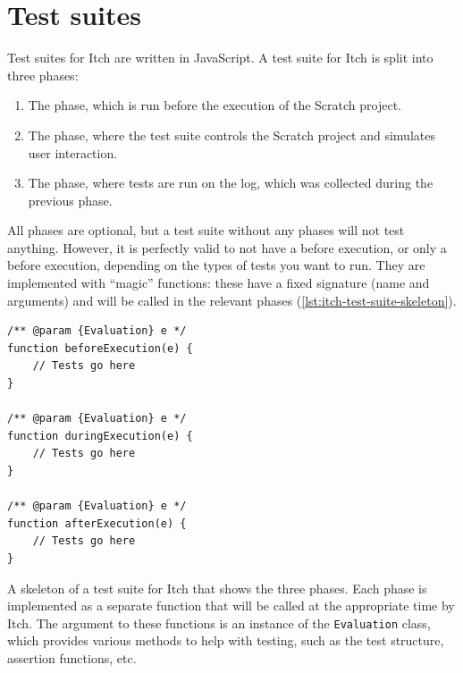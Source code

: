 \documentclass[../main]{subfiles}
\begin{document}
%

\section{Test suites}\label{sec:itch-test-suites}

Test suites for Itch are written in JavaScript.
A test suite for Itch is split into three phases:

\begin{enumerate}
    \item The  phase, which is run before the execution of the Scratch project.
    \item The  phase, where the test suite controls the Scratch project and simulates user interaction.
    \item The  phase, where tests are run on the log, which was collected during the previous phase.
\end{enumerate}

All phases are optional, but a test suite without any phases will not test anything.
However, it is perfectly valid to not have a before execution, or only a before execution, depending on the types of tests you want to run.
They are implemented with ``magic'' functions: these have a fixed signature (name and arguments) and will be called in the relevant phases (\cref{lst:itch-test-suite-skeleton}).

\begin{listing}
    \begin{verbatim}
/** @param {Evaluation} e */
function beforeExecution(e) {
    // Tests go here
}

/** @param {Evaluation} e */
function duringExecution(e) {
    // Tests go here
}

/** @param {Evaluation} e */
function afterExecution(e) {
    // Tests go here
}
    \end{verbatim}
    \caption[]{
        A skeleton of a test suite for Itch that shows the three phases.
        Each phase is implemented as a separate function that will be called at the appropriate time by Itch.
        The argument to these functions is an instance of the \texttt{Evaluation} class, which provides various methods to help with testing, such as the test structure, assertion functions, etc.
    }
    \label{lst:itch-test-suite-skeleton}
\end{listing}
\end{document}
